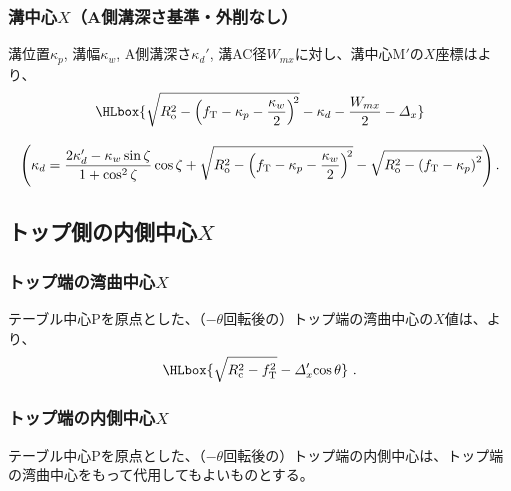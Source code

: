 \subsubsection{溝中心\texorpdfstring{$X$}{X}（A側溝深さ基準・外削なし）}
溝位置$\kappa_p$, 溝幅$\kappa_w$, A側溝深さ$\kappa_d'$, 溝AC径$W_{mx}$に対し、溝中心M$'$の$X$座標はより、
\begin{gather*}
  \HLbox{%
    \sqrt{R_\mathrm o^2-\left(f_\mathrm T-\kappa_p-\frac{\kappa_w}2\right)^{\!2}}
    -\kappa_d
    -\frac{W_{mx}}2
    -\varDelta_x%
  }\\[9pt]
  \left(
  \kappa_d
  = \frac{2\kappa_d'-\kappa_w\sin\zeta}{1+\cos^2\zeta}\cos\zeta
    +\sqrt{R_\mathrm o^2-\left(f_\mathrm T-\kappa_p-\frac{\kappa_w}2\right)^{\!2}}
    -\sqrt{R_\mathrm o^2-\left(f_\mathrm T-\kappa_p\right)^2}
  \right).
\end{gather*}


\clearpage
\subsection{トップ側の内側中心\texorpdfstring{$X$}{X}}

\subsubsection{トップ端の湾曲中心\texorpdfstring{$X$}{X}}
テーブル中心Pを原点とした、（$-\theta$回転後の）トップ端の湾曲中心の$X$値は、より、
\begin{align*}
  \HLbox{\sqrt{R_\mathrm c^2-f_\mathrm T^2}-\varDelta_x'\!\cos\theta}~.
\end{align*}

\subsubsection{トップ端の内側中心\texorpdfstring{$X$}{X}}
テーブル中心Pを原点とした、（$-\theta$回転後の）トップ端の内側中心は、トップ端の湾曲中心をもって代用してもよいものとする。


